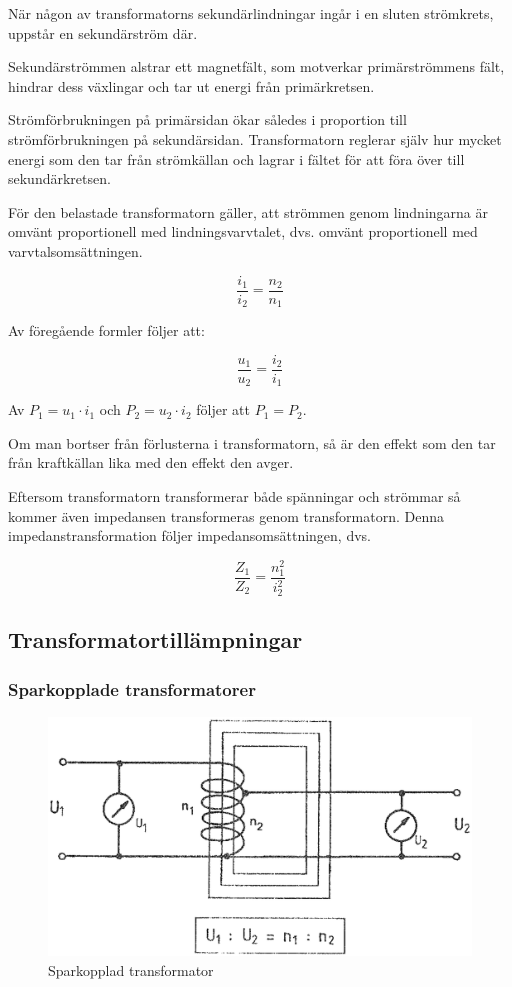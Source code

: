 När någon av transformatorns sekundärlindningar ingår i en sluten strömkrets,
uppstår en sekundärström där.

Sekundärströmmen alstrar ett magnetfält, som motverkar primärströmmens fält,
hindrar dess växlingar och tar ut energi från primärkretsen.

Strömförbrukningen på primärsidan ökar således i proportion till
strömförbrukningen på sekundärsidan. Transformatorn reglerar själv hur mycket
energi som den tar från strömkällan och lagrar i fältet för att föra över
till sekundärkretsen.

För den belastade transformatorn gäller, att strömmen genom lindningarna är
omvänt proportionell med lindningsvarvtalet, dvs. omvänt proportionell med
varvtalsomsättningen.

\[\frac{i_1}{i_2} = \frac{n_2}{n_1}\]

Av föregående formler följer att:

\[\frac{u_1}{u_2} = \frac{i_2}{i_1}\]

Av \(P_1 = u_1 \cdot i_1\) och \(P_2 = u_2 \cdot i_2\) följer att \(P_1 = P_2\).

Om man bortser från förlusterna i transformatorn, så är den effekt som den tar
från kraftkällan lika med den effekt den avger.

Eftersom transformatorn transformerar både spänningar och strömmar så kommer
även impedansen transformeras genom transformatorn.
Denna impedanstransformation följer impedansomsättningen, dvs.

\[ \frac{Z_1}{Z_2} = \frac{n_1^2}{i_2^2} \]

\subsection{Transformatortillämpningar}

\subsubsection{Sparkopplade transformatorer}

\begin{figure}[ht]
\begin{center}
\includegraphics[width=.7\textwidth]{images/cropped_pdfs/bild_2_2-08.pdf}
\caption{Sparkopplad transformator}
\label{fig:BildII2-8}
\end{center}
\end{figure}

